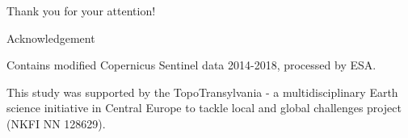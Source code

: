 \documentclass{beamer}
\begin{document}
\begin{frame}
    \begin{center}
        \Huge \fcol
        Thank you for your attention!
    \end{center}
    \vspace{25pt}
    
    \begin{center}
        \Large \fcol \center Acknowledgement
    \end{center}
    \vspace{10pt}
    
    Contains modified Copernicus Sentinel data 2014-2018, processed by ESA.
    
    This study was supported by the TopoTransylvania - a multidisciplinary Earth science initiative in Central Europe to tackle local and global challenges project (NKFI NN 128629).
\end{frame}
\end{document}
